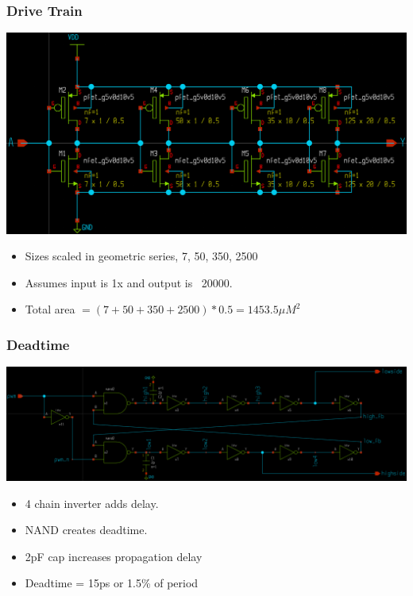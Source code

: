 \documentclass{beamer}
\begin{document}
\begin{frame}
  \frametitle{Drive Train}
  \includegraphics[scale=0.08]{drive-train.png}
  \begin{itemize}
  \item Sizes scaled in geometric series, 7, 50, 350, 2500
  \item Assumes input is 1x and output is ~20000.
  \item Total area $= (7 + 50 + 350 + 2500) * 0.5 = 1453.5 \mu M^2$
  \end{itemize}
\end{frame}

\begin{frame}
  \frametitle{Deadtime}
  \includegraphics[scale=0.085]{deadtime.png}
  \begin{itemize}
  \item 4 chain inverter adds delay.
  \item NAND creates deadtime.
  \item 2pF cap increases propagation delay
  \item Deadtime = 15ps or 1.5\%  of period
  \end{itemize}
\end{frame}
\end{document}

